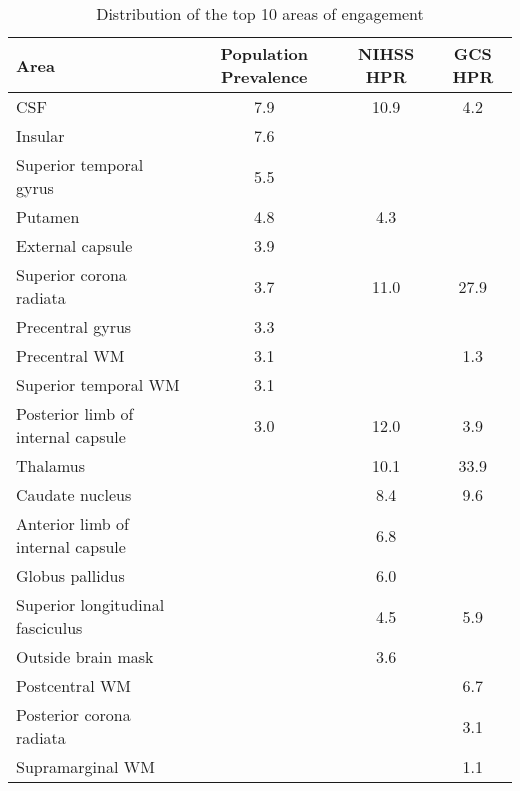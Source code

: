 \begin{table}[ht]
\centering
\begin{tabular}{lccc}
  \hline
Area & Population Prevalence & NIHSS HPR & GCS HPR \\ 
  \hline
CSF & 7.9 & 10.9 & 4.2 \\ 
  Insular & 7.6 &  &  \\ 
  Superior temporal gyrus & 5.5 &  &  \\ 
  Putamen & 4.8 & 4.3 &  \\ 
  External capsule & 3.9 &  &  \\ 
  Superior corona radiata & 3.7 & 11.0 & 27.9 \\ 
  Precentral gyrus & 3.3 &  &  \\ 
  Precentral WM & 3.1 &  & 1.3 \\ 
  Superior temporal WM & 3.1 &  &  \\ 
  Posterior limb of internal capsule & 3.0 & 12.0 & 3.9 \\ 
  Thalamus &  & 10.1 & 33.9 \\ 
  Caudate nucleus &  & 8.4 & 9.6 \\ 
  Anterior limb of internal capsule &  & 6.8 &  \\ 
  Globus pallidus &  & 6.0 &  \\ 
  Superior longitudinal fasciculus &  & 4.5 & 5.9 \\ 
  Outside brain mask &  & 3.6 &  \\ 
  Postcentral WM &  &  & 6.7 \\ 
  Posterior corona radiata &  &  & 3.1 \\ 
  Supramarginal WM &  &  & 1.1 \\ 
   \hline
\end{tabular}
\caption{Distribution of the top 10 areas of engagement} 
\label{t:breakdown}
\end{table}
